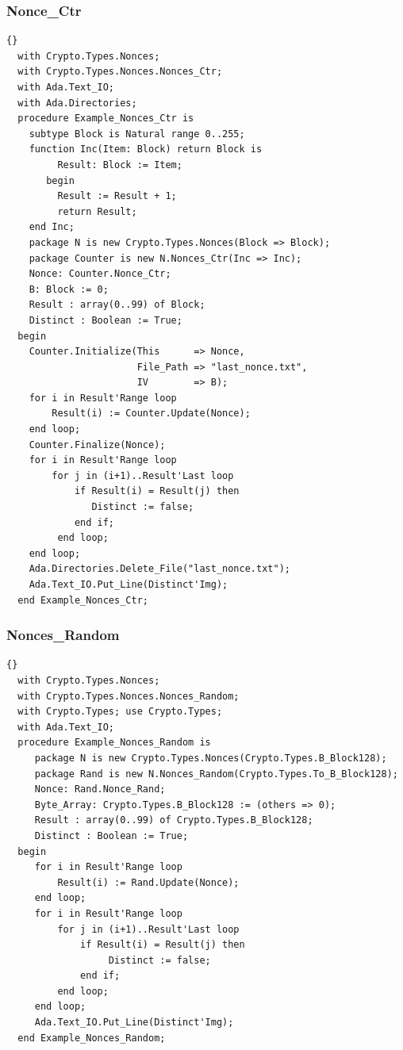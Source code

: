 \subsubsection*{Nonce\_Ctr}
\begin{lstlisting}{}
  with Crypto.Types.Nonces;
  with Crypto.Types.Nonces.Nonces_Ctr;
  with Ada.Text_IO;
  with Ada.Directories;
  procedure Example_Nonces_Ctr is
    subtype Block is Natural range 0..255;
    function Inc(Item: Block) return Block is
         Result: Block := Item;
       begin
         Result := Result + 1;
         return Result;
    end Inc;
    package N is new Crypto.Types.Nonces(Block => Block);
    package Counter is new N.Nonces_Ctr(Inc => Inc);
    Nonce: Counter.Nonce_Ctr;
    B: Block := 0;
    Result : array(0..99) of Block;
    Distinct : Boolean := True;
  begin
    Counter.Initialize(This      => Nonce,
                       File_Path => "last_nonce.txt",
                       IV        => B);
    for i in Result'Range loop
        Result(i) := Counter.Update(Nonce);
    end loop;
    Counter.Finalize(Nonce);
    for i in Result'Range loop
        for j in (i+1)..Result'Last loop
            if Result(i) = Result(j) then
               Distinct := false;
            end if;
         end loop;
    end loop;
    Ada.Directories.Delete_File("last_nonce.txt");
    Ada.Text_IO.Put_Line(Distinct'Img);
  end Example_Nonces_Ctr;
\end{lstlisting}


\subsubsection*{Nonces\_Random}
\begin{lstlisting}{}
  with Crypto.Types.Nonces;
  with Crypto.Types.Nonces.Nonces_Random;
  with Crypto.Types; use Crypto.Types;
  with Ada.Text_IO;
  procedure Example_Nonces_Random is
     package N is new Crypto.Types.Nonces(Crypto.Types.B_Block128);
     package Rand is new N.Nonces_Random(Crypto.Types.To_B_Block128);
     Nonce: Rand.Nonce_Rand;
     Byte_Array: Crypto.Types.B_Block128 := (others => 0);
     Result : array(0..99) of Crypto.Types.B_Block128;
     Distinct : Boolean := True;
  begin
     for i in Result'Range loop
         Result(i) := Rand.Update(Nonce);
     end loop;
     for i in Result'Range loop
         for j in (i+1)..Result'Last loop
             if Result(i) = Result(j) then
                  Distinct := false;
             end if;
         end loop;
     end loop;
     Ada.Text_IO.Put_Line(Distinct'Img);
  end Example_Nonces_Random;
\end{lstlisting}
